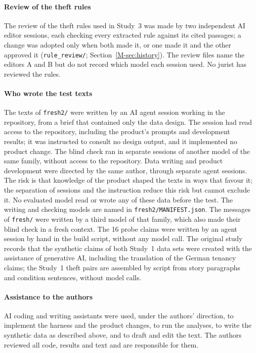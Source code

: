 \paragraph{Review of the theft rules}
The review of the theft rules used in Study~3 was made by two independent AI editor sessions, each checking every extracted rule against its cited passages; a change was adopted only when both made it, or one made it and the other approved it (\texttt{rule\_review/}; Section~\ref{M-sec:history}). The review files name the editors A and B but do not record which model each session used. No jurist has reviewed the rules.

\paragraph{Who wrote the test texts}
The texts of \texttt{fresh2/} were written by an AI agent session working in the repository, from a brief that contained only the data design. The session had read access to the repository, including the product's prompts and development results; it was instructed to consult no design output, and it implemented no product change. The blind check ran in separate sessions of another model of the same family, without access to the repository. Data writing and product development were directed by the same author, through separate agent sessions. The risk is that knowledge of the product shaped the texts in ways that favour it; the separation of sessions and the instruction reduce this risk but cannot exclude it. No evaluated model read or wrote any of these data before the test. The writing and checking models are named in \texttt{fresh2/\allowbreak{}MANIFEST.json}. The messages of \texttt{fresh/} were written by a third model of that family, which also made their blind check in a fresh context. The 16 probe claims were written by an agent session by hand in the build script, without any model call. The original study records that the synthetic claims of both Study~1 data sets were created with the assistance of generative AI, including the translation of the German tenancy claims; the Study~1 theft pairs are assembled by script from story paragraphs and condition sentences, without model calls.

\paragraph{Assistance to the authors}
AI coding and writing assistants were used, under the authors' direction, to implement the harness and the product changes, to run the analyses, to write the synthetic data as described above, and to draft and edit the text. The authors reviewed all code, results and text and are responsible for them.
